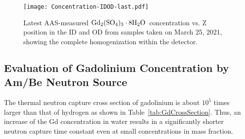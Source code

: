 \documentclass[preprint,12pt]{elsarticle}
\newcommand{\GdSOw}{$\rm Gd_2(\rm SO_4)_3\cdot \rm 8H_2O$\ }
\begin{document}

\begin{figure}[htb]
    \centering\texttt{[image: Concentration-IDOD-last.pdf]}
\caption{Latest AAS-measured \GdSOw concentration vs. Z position in the ID and OD from samples taken on March 25, 2021, showing the complete homogenization within the detector.}
\label{fig:Concentration-IDOD-last}
\end{figure}



\subsection{Evaluation of Gadolinium Concentration by Am/Be Neutron Source}%
%
The thermal neutron capture cross section of gadolinium is about $10^5$ times larger than that of hydrogen as shown in Table~\ref{tab:GdCrossSection}.
Thus, an increase of the Gd concentration in water results in a significantly shorter neutron capture time constant even at small concentrations in mass fraction.
\end{document}
